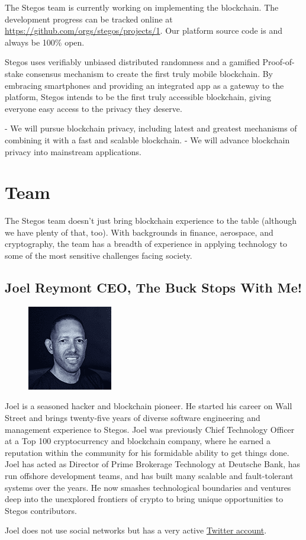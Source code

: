 \documentclass[8pt,fleqn,openany]{book}
\begin{document}
The Stegos team is currently working on implementing the blockchain. The development progress can be tracked online at \url{https://github.com/orgs/stegos/projects/1}. Our platform source code is and always be 100\% open.

Stegos uses verifiably unbiased distributed randomness and a gamified Proof-of-stake consensus mechanism to create the first truly mobile blockchain. By embracing smartphones and providing an integrated app as a gateway to the platform, Stegos intends to be the first truly accessible blockchain, giving everyone easy access to the privacy they deserve.     

- We will pursue blockchain privacy, including latest and greatest mechanisms of combining it with a fast and scalable blockchain.
- We will advance blockchain privacy into mainstream applications.

\chapter{Team}\label{app:team}

The Stegos team doesn’t just bring blockchain experience to the table (although we have plenty of that, too). With backgrounds in finance, aerospace, and cryptography, the team has a breadth of experience in applying technology to some of the most sensitive challenges facing society.

\section{Joel Reymont CEO, The Buck Stops With Me!}

{
\setlength\intextsep{0pt}
\begin{figure}
	\includegraphics{images/team/team-1.png}
\end{figure}

Joel is a seasoned hacker and blockchain pioneer. He started his career on Wall Street and brings twenty-five years of diverse software engineering and management experience to Stegos. Joel was previously Chief Technology Officer at a Top 100 cryptocurrency and blockchain company, where he earned a reputation within the community for his formidable ability to get things done. Joel has acted as Director of Prime Brokerage Technology at Deutsche Bank, has run offshore development teams, and has built many scalable and fault-tolerant systems over the years. He now smashes technological boundaries and ventures deep into the unexplored frontiers of crypto to bring unique opportunities to Stegos contributors. 

Joel does not use social networks but has a very active \href{http://twitter.com/joelreymont}{Twitter account}.
}
\end{document}
